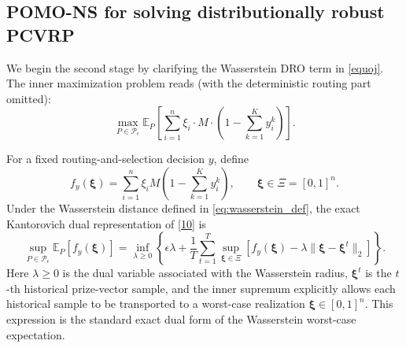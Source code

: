 \documentclass[preprint,12pt,authoryear]{elsarticle}
\theoremstyle{definition}
\begin{document}
\subsection{POMO-NS for solving distributionally robust PCVRP}
\label{POMO-NS}

We begin the second stage by clarifying the Wasserstein DRO term in \eqref{equoj}. The inner maximization problem reads (with the deterministic routing part omitted): 
\begin{equation}
\max_{P \in \mathcal{P}_{\epsilon}} 
\mathbb{E}_P \left[ 
\sum_{i=1}^n \xi_i \cdot M \cdot \left( 1 - \sum_{k=1}^K y_i^k \right) 
\right].
\label{10}
\end{equation}

For a fixed routing-and-selection decision $y$, define
\begin{equation}
f_y(\boldsymbol{\xi})=
\sum_{i=1}^n \xi_i M \left( 1 - \sum_{k=1}^K y_i^k \right),
\qquad \boldsymbol{\xi}\in\Xi=[0,1]^n .
\end{equation}
Under the Wasserstein distance defined in \eqref{eq:wasserstein_def}, the exact Kantorovich dual representation of \eqref{10} is
\begin{equation}
\sup_{P\in\mathcal{P}_\epsilon}\mathbb{E}_P[f_y(\boldsymbol{\xi})]
=
\inf_{\lambda\ge 0}
\left\{
\epsilon\lambda+
\frac{1}{T}\sum_{t=1}^{T}
\sup_{\boldsymbol{\xi}\in\Xi}
\left[
f_y(\boldsymbol{\xi})
-\lambda\|\boldsymbol{\xi}-\boldsymbol{\xi}^t\|_2
\right]
\right\}.
\label{11}
\end{equation}
Here $\lambda \geq 0$ is the dual variable associated with the Wasserstein radius, $\boldsymbol{\xi}^t$ is the $t$-th historical prize-vector sample, and the inner supremum explicitly allows each historical sample to be transported to a worst-case realization $\boldsymbol{\xi}\in[0,1]^n$. This expression is the standard exact dual form of the Wasserstein worst-case expectation.
\end{document}
